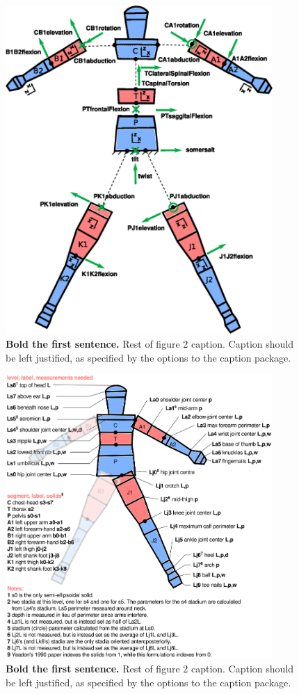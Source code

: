 \documentclass[10pt]{article}
\begin{document}
\begin{figure}[!ht]
\begin{center}
\includegraphics[width=4in]{configuration.eps}
\end{center}
\caption{
{\bf Bold the first sentence.}  Rest of figure 2  caption.  Caption 
should be left justified, as specified by the options to the caption 
package.
}
\label{fig:config}
\end{figure}

\begin{figure}[!ht]
\begin{center}
\includegraphics[width=4in]{measurements.eps}
\end{center}
\caption{
{\bf Bold the first sentence.}  Rest of figure 2  caption.  Caption 
should be left justified, as specified by the options to the caption 
package.
}
\label{fig:meas}
\end{figure}
\end{document}
